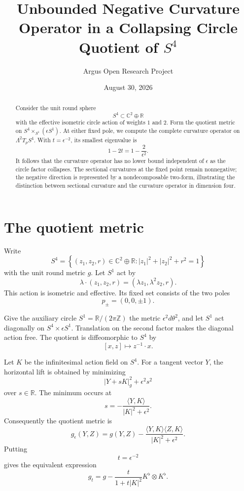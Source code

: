 \documentclass[10pt,reqno]{amsart}
\title[Curvature-operator blow-up in a circle quotient]
{Unbounded Negative Curvature Operator in a Collapsing Circle Quotient of \(S^4\)}
\author{Argus Open Research Project}
\date{August 30, 2026}
\theoremstyle{definition}
\begin{document}
\begin{abstract}
Consider the unit round sphere
\[
 S^4\subset\mathbb C^2\oplus\mathbb R
\]
with the effective isometric circle action of weights \(1\) and \(2\).
Form the quotient metric on
\(S^4\times_{S^1}(\epsilon S^1)\).
At either fixed pole, we compute the complete curvature operator on
\(\Lambda^2T_pS^4\).  With \(t=\epsilon^{-2}\), its smallest eigenvalue is
\[
 1-2t=1-\frac{2}{\epsilon^2}.
\]
It follows that the curvature operator has no lower bound independent of
\(\epsilon\) as the circle factor collapses.  The sectional curvatures at
the fixed point remain nonnegative; the negative direction is represented by
a nondecomposable two-form, illustrating the distinction between sectional
curvature and the curvature operator in dimension four.
\end{abstract}

\maketitle

\section{The quotient metric}

Write
\[
 S^4=\left\{(z_1,z_2,r)\in\mathbb C^2\oplus\mathbb R:
 |z_1|^2+|z_2|^2+r^2=1\right\}
\]
with the unit round metric \(g\).  Let \(S^1\) act by
\[
 \lambda\cdot(z_1,z_2,r)
 =(\lambda z_1,\lambda^2z_2,r).
\]
This action is isometric and effective.  Its fixed set consists of the two
poles
\[
 p_{\pm}=(0,0,\pm1).
\]

Give the auxiliary circle \(S^1=\mathbb R/(2\pi\mathbb Z)\) the metric
\(\epsilon^2d\theta^2\), and let \(S^1\) act diagonally on
\(S^4\times\epsilon S^1\).  Translation on the second factor makes the
diagonal action free.  The quotient is diffeomorphic to \(S^4\) by
\[
 [x,z]\longmapsto z^{-1}\cdot x.
\]

Let \(K\) be the infinitesimal action field on \(S^4\).  For a tangent vector
\(Y\), the horizontal lift is obtained by minimizing
\[
 \lvert Y+sK\rvert_g^2+\epsilon^2s^2
\]
over \(s\in\mathbb R\).  The minimum occurs at
\[
 s=-\frac{\langle Y,K\rangle}{\lvert K\rvert^2+\epsilon^2}.
\]
Consequently the quotient metric is
\[
 g_{\epsilon}(Y,Z)
 =g(Y,Z)
 -\frac{\langle Y,K\rangle\langle Z,K\rangle}
 {\lvert K\rvert^2+\epsilon^2}.
\]
Putting
\[
 t=\epsilon^{-2}
\]
gives the equivalent expression
\begin{equation}\label{eq:metric}
 g_t=g-\frac{t}{1+t\lvert K\rvert^2}
 K^{\flat}\otimes K^{\flat}.
\end{equation}
\end{document}
